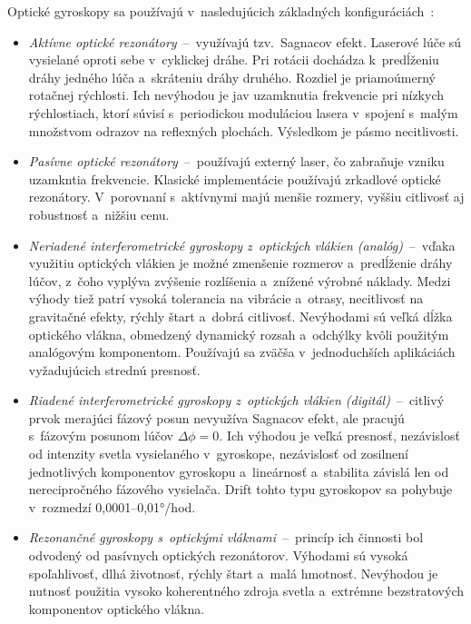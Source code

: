       Optické gyroskopy sa používajú v~nasledujúcich základných konfiguráciách~\cite{duchonSnimaceMobilnejRobotike2012}:
      \begin{itemize}
        \item \emph{Aktívne optické rezonátory}~--~využívajú tzv.\ Sagnacov efekt. Laserové lúče sú vysielané oproti sebe v~cyklickej dráhe. Pri rotácii dochádza k~predĺženiu dráhy jedného lúča a~skráteniu dráhy druhého. Rozdiel je priamoúmerný rotačnej rýchlosti. Ich nevýhodou je jav uzamknutia frekvencie pri nízkych rýchlostiach, ktorí súvisí s~periodickou moduláciou lasera v~spojení s~malým množstvom odrazov na reflexných plochách. Výsledkom je pásmo necitlivosti.
        \item \emph{Pasívne optické rezonátory}~--~používajú externý laser, čo zabraňuje vzniku uzamkntia frekvencie. Klasické implementácie používajú zrkadlové optické rezonátory. V~porovnaní s~aktívnymi majú menšie rozmery, vyššiu citlivosť aj robustnosť a~nižšiu cenu.
        \item \emph{Neriadené interferometrické gyroskopy z~optických vlákien (analóg)}~--~vďaka využitiu optických vlákien je možné zmenšenie rozmerov a~predĺženie dráhy lúčov, z~čoho vyplýva zvýšenie rozlíšenia a~znížené výrobné náklady. Medzi výhody tiež patrí vysoká tolerancia na vibrácie a~otrasy, necitlivosť na gravitačné efekty, rýchly štart a~dobrá citlivosť. Nevýhodami sú veľká dĺžka optického vlákna, obmedzený dynamický rozsah a~odchýlky kvôli použitým analógovým komponentom. Používajú sa zväčša v~jednoduchších aplikáciách vyžadujúcich strednú presnosť.
        \item \emph{Riadené interferometrické gyroskopy z~optických vlákien (digitál)}~--~citlivý prvok merajúci fázový posun nevyužíva Sagnacov efekt, ale pracujú s~fázovým posunom lúčov $\Delta \phi = 0$. Ich výhodou je veľká presnosť, nezávislosť od intenzity svetla vysielaného v~gyroskope, nezávislosť od zosilnení jednotlivých komponentov gyroskopu a~lineárnosť a~stabilita závislá len od nerecipročného fázového vysielača. Drift tohto typu gyroskopov sa pohybuje v~rozmedzí 0,0001--0,01°/hod.
        \item \emph{Rezonančné gyroskopy s~optickými vláknami}~--~princíp ich činnosti bol odvodený od pasívnych optických rezonátorov. Výhodami sú vysoká spoľahlivosť, dlhá životnosť, rýchly štart a~malá hmotnosť. Nevýhodou je nutnosť použitia vysoko koherentného zdroja svetla a~extrémne bezstratových komponentov optického vlákna.
      \end{itemize}
    
